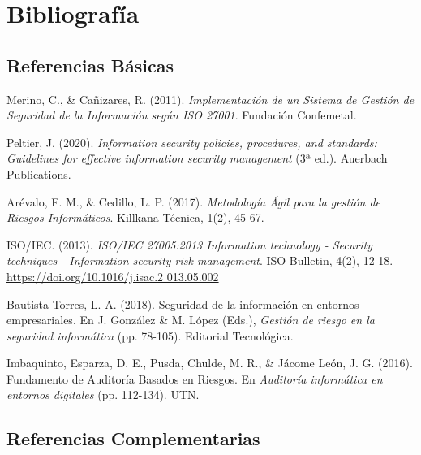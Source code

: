 \section{Bibliografía}


\subsection*{Referencias Básicas}

\hangindent=0.5in
Merino, C., \& Cañizares, R. (2011). \textit{Implementación de un Sistema de Gestión de Seguridad de la Información según ISO 27001}. Fundación Confemetal.

\hangindent=0.5in
Peltier, J. (2020). \textit{Information security policies, procedures, and standards: Guidelines for effective information security management} (3ª ed.). Auerbach Publications.

\hangindent=0.5in
Arévalo, F. M., \& Cedillo, L. P. (2017). \textit{Metodología Ágil para la gestión de Riesgos Informáticos}. Killkana Técnica, 1(2), 45-67.

\hangindent=0.5in
ISO/IEC. (2013). \textit{ISO/IEC 27005:2013 Information technology - Security techniques - Information security risk management}. ISO Bulletin, 4(2), 12-18. \href{https://doi.org/10.1016/j.isac.2013.05.002}{https://doi.org/10.1016/j.isac.2 013.05.002}

\hangindent=0.5in
Bautista Torres, L. A. (2018). Seguridad de la información en entornos empresariales. En J. González \& M. López (Eds.), \textit{Gestión de riesgo en la seguridad informática} (pp. 78-105). Editorial Tecnológica.

\hangindent=0.5in
Imbaquinto, Esparza, D. E., Pusda, Chulde, M. R., \& Jácome León, J. G. (2016). Fundamento de Auditoría Basados en Riesgos. En \textit{Auditoría informática en entornos digitales} (pp. 112-134). UTN.

\subsection*{Referencias Complementarias}
\pagebreak